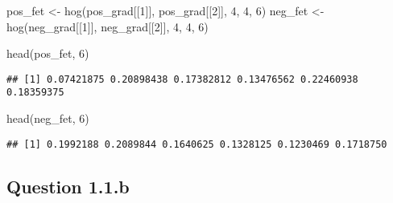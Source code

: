 \documentclass[
]{article}
\newenvironment{Shaded}{\begin{snugshade}}{\end{snugshade}}
\newcommand{\DecValTok}[1]{\textcolor[rgb]{0.00,0.00,0.81}{#1}}
\newcommand{\FunctionTok}[1]{\textcolor[rgb]{0.00,0.00,0.00}{#1}}
\newcommand{\NormalTok}[1]{#1}
\newcommand{\OtherTok}[1]{\textcolor[rgb]{0.56,0.35,0.01}{#1}}
\begin{document}
\begin{Shaded}
\begin{Highlighting}[]
\NormalTok{pos\_fet }\OtherTok{\textless{}{-}} \FunctionTok{hog}\NormalTok{(pos\_grad[[}\DecValTok{1}\NormalTok{]], pos\_grad[[}\DecValTok{2}\NormalTok{]], }\DecValTok{4}\NormalTok{, }\DecValTok{4}\NormalTok{, }\DecValTok{6}\NormalTok{)}
\NormalTok{neg\_fet }\OtherTok{\textless{}{-}} \FunctionTok{hog}\NormalTok{(neg\_grad[[}\DecValTok{1}\NormalTok{]], neg\_grad[[}\DecValTok{2}\NormalTok{]], }\DecValTok{4}\NormalTok{, }\DecValTok{4}\NormalTok{, }\DecValTok{6}\NormalTok{)}

\FunctionTok{head}\NormalTok{(pos\_fet, }\DecValTok{6}\NormalTok{)}
\end{Highlighting}
\end{Shaded}

\begin{verbatim}
## [1] 0.07421875 0.20898438 0.17382812 0.13476562 0.22460938 0.18359375
\end{verbatim}

\begin{Shaded}
\begin{Highlighting}[]
\FunctionTok{head}\NormalTok{(neg\_fet, }\DecValTok{6}\NormalTok{)}
\end{Highlighting}
\end{Shaded}

\begin{verbatim}
## [1] 0.1992188 0.2089844 0.1640625 0.1328125 0.1230469 0.1718750
\end{verbatim}

\hypertarget{question-1.1.b}{%
\subsection{Question 1.1.b}\label{question-1.1.b}}
\end{document}
